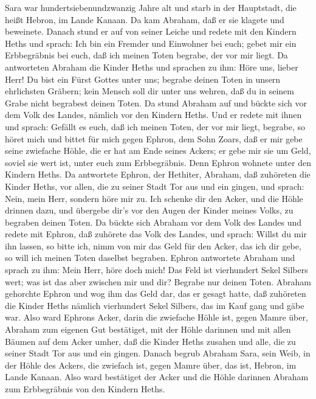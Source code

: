  Sara war hundertsiebenundzwanzig Jahre alt  und
starb in der Hauptstadt, die heißt Hebron, im Lande Kanaan. Da kam
Abraham, daß er sie klagete und beweinete.  Danach stund er
auf von seiner Leiche und redete mit den Kindern Heths und sprach:
 Ich bin ein Fremder und Einwohner bei euch; gebet mir ein
Erbbegräbnis bei euch, daß ich meinen Toten begrabe, der vor mir liegt.
 Da antworteten Abraham die Kinder Heths und sprachen zu
ihm:  Höre uns, lieber Herr! Du bist ein Fürst Gottes unter
uns; begrabe deinen Toten in unsern ehrlichsten Gräbern; kein Mensch
soll dir unter uns wehren, daß du in seinem Grabe nicht begrabest deinen
Toten.  Da stund Abraham auf und bückte sich vor dem Volk
des Landes, nämlich vor den Kindern Heths.  Und er redete
mit ihnen und sprach: Gefällt es euch, daß ich meinen Toten, der vor mir
liegt, begrabe, so höret mich und bittet für mich gegen Ephron, dem Sohn
Zoars,  daß er mir gebe seine zwiefache Höhle, die er hat am
Ende seines Ackers; er gebe mir sie um Geld, soviel sie wert ist, unter
euch zum Erbbegräbnis.  Denn Ephron wohnete unter den
Kindern Heths. Da antwortete Ephron, der Hethiter, Abraham, daß
zuhöreten die Kinder Heths, vor allen, die zu seiner Stadt Tor aus und
ein gingen, und sprach:  Nein, mein Herr, sondern höre mir
zu. Ich schenke dir den Acker, und die Höhle drinnen dazu, und übergebe
dir's vor den Augen der Kinder meines Volks, zu begraben deinen Toten.
 Da bückte sich Abraham vor dem Volk des Landes
 und redete mit Ephron, daß zuhörete das Volk des Landes,
und sprach: Willst du mir ihn lassen, so bitte ich, nimm von mir das
Geld für den Acker, das ich dir gebe, so will ich meinen Toten daselbst
begraben.  Ephron antwortete Abraham und sprach zu ihm:
 Mein Herr, höre doch mich! Das Feld ist vierhundert Sekel
Silbers wert; was ist das aber zwischen mir und dir? Begrabe nur deinen
Toten.  Abraham gehorchte Ephron und wog ihm das Geld dar,
das er gesagt hatte, daß zuhöreten die Kinder Heths nämlich vierhundert
Sekel Silbers, das im Kauf gang und gäbe war.  Also ward
Ephrons Acker, darin die zwiefache Höhle ist, gegen Mamre über, Abraham
zum eigenen Gut bestätiget, mit der Höhle darinnen und mit allen Bäumen
auf dem Acker umher,  daß die Kinder Heths zusahen und
alle, die zu seiner Stadt Tor aus und ein gingen.  Danach
begrub Abraham Sara, sein Weib, in der Höhle des Ackers, die zwiefach
ist, gegen Mamre über, das ist, Hebron, im Lande Kanaan. 
Also ward bestätiget der Acker und die Höhle darinnen Abraham zum
Erbbegräbnis von den Kindern Heths.

